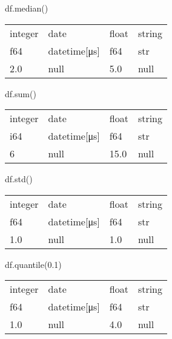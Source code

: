 \documentclass[
  letterpaper,
  DIV=11,
  numbers=noendperiod]{scrartcl}
\newenvironment{Shaded}{\begin{snugshade}}{\end{snugshade}}
\newcommand{\BuiltInTok}[1]{\textcolor[rgb]{0.00,0.23,0.31}{#1}}
\newcommand{\FloatTok}[1]{\textcolor[rgb]{0.68,0.00,0.00}{#1}}
\newcommand{\NormalTok}[1]{\textcolor[rgb]{0.00,0.23,0.31}{#1}}
\begin{document}
\begin{Shaded}
\begin{Highlighting}[]
\NormalTok{df.median()}
\end{Highlighting}
\end{Shaded}

\begin{longtable}[]{@{}llll@{}}
\toprule()
integer & date & float & string \\
f64 & datetime{[}μs{]} & f64 & str \\
\midrule()
\endhead
2.0 & null & 5.0 & null \\
\bottomrule()
\end{longtable}

\begin{Shaded}
\begin{Highlighting}[]
\NormalTok{df.}\BuiltInTok{sum}\NormalTok{()}
\end{Highlighting}
\end{Shaded}

\begin{longtable}[]{@{}llll@{}}
\toprule()
integer & date & float & string \\
i64 & datetime{[}μs{]} & f64 & str \\
\midrule()
\endhead
6 & null & 15.0 & null \\
\bottomrule()
\end{longtable}

\begin{Shaded}
\begin{Highlighting}[]
\NormalTok{df.std()}
\end{Highlighting}
\end{Shaded}

\begin{longtable}[]{@{}llll@{}}
\toprule()
integer & date & float & string \\
f64 & datetime{[}μs{]} & f64 & str \\
\midrule()
\endhead
1.0 & null & 1.0 & null \\
\bottomrule()
\end{longtable}

\begin{Shaded}
\begin{Highlighting}[]
\NormalTok{df.quantile(}\FloatTok{0.1}\NormalTok{)}
\end{Highlighting}
\end{Shaded}

\begin{longtable}[]{@{}llll@{}}
\toprule()
integer & date & float & string \\
f64 & datetime{[}μs{]} & f64 & str \\
\midrule()
\endhead
1.0 & null & 4.0 & null \\
\bottomrule()
\end{longtable}
\end{document}
